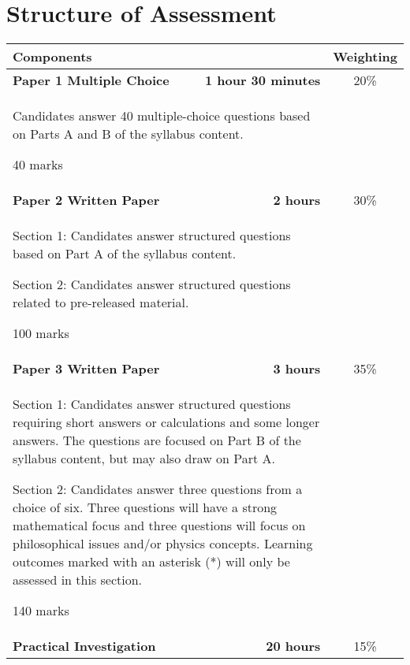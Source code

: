 \documentclass[revision-guide.tex]{subfiles}
\begin{document}
\chapter{Structure of Assessment}
\begin{table}[ht]
  \begin{tabular}{|lr|c|}
    \hline
    \textbf{Components} & & \textbf{Weighting} \\
    \hline
    \textbf{Paper 1 Multiple Choice} & \textbf{1 hour 30 minutes} & 20\% \\
    \multicolumn{2}{|p{10cm}|}{Candidates answer 40 multiple-choice questions based on Parts A and B of the syllabus content.

40 marks} & \\ \hline
\textbf{Paper 2 Written Paper} & \textbf{2 hours} & 30\% \\
\multicolumn{2}{|p{10cm}|}{Section 1: Candidates answer structured questions based on Part A of the syllabus
content.

Section 2: Candidates answer structured questions related to pre-released material.

100 marks} & \\ \hline
\textbf{Paper 3 Written Paper} & \textbf{3 hours} & 35\% \\
\multicolumn{2}{|p{10cm}|}{Section 1: Candidates answer structured questions requiring short answers or calculations and some longer answers. The questions are focused on Part B of the syllabus content, but may also draw on Part A.

Section 2: Candidates answer three questions from a choice of six. Three questions will have a strong mathematical focus and three questions will focus on philosophical issues and/or physics concepts. Learning outcomes marked with an asterisk (*) will only be assessed in this section.

140 marks} & \\ \hline
\textbf{Practical Investigation} & \textbf{20 hours} & 15\% \\
\hline
  \end{tabular}
\end{table}
\end{document}
